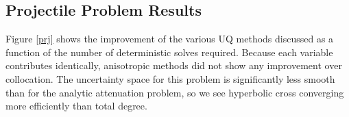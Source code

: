 \documentclass{mc2015}
\begin{document}
\subsection{Projectile Problem Results}
Figure \ref{prj} shows the improvement of the various UQ methods discussed as a function of the number of deterministic solves required.  Because each variable contributes identically, anisotropic methods did not show any improvement over collocation.  The uncertainty space for this problem is significantly less smooth than for the analytic attenuation problem, so we see hyperbolic cross converging more efficiently than total degree.  
\end{document}
